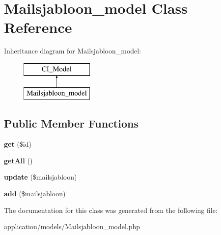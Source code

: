 \hypertarget{class_mailsjabloon__model}{}\section{Mailsjabloon\+\_\+model Class Reference}
\label{class_mailsjabloon__model}
Inheritance diagram for Mailsjabloon\+\_\+model\+:\begin{figure}[H]
\begin{center}
\leavevmode
\includegraphics[height=2.000000cm]{class_mailsjabloon__model}
\end{center}
\end{figure}
\subsection*{Public Member Functions}
\begin{DoxyCompactItemize}
\item 
\mbox{\label{class_mailsjabloon__model_a50e3bfb586b2f42932a6a93f3fbb0828}} 
{\bfseries get} (\$id)
\item 
\mbox{\label{class_mailsjabloon__model_aba0d5b303383fb5b1fabb5fd01cd3800}} 
{\bfseries get\+All} ()
\item 
\mbox{\label{class_mailsjabloon__model_ae7c31bc24182f5bed6dc1bfb9652e9ed}} 
{\bfseries update} (\$mailsjabloon)
\item 
\mbox{\label{class_mailsjabloon__model_a412547fc897d39826ee90937b53995e6}} 
{\bfseries add} (\$mailsjabloon)
\end{DoxyCompactItemize}


The documentation for this class was generated from the following file\+:\begin{DoxyCompactItemize}
\item 
application/models/Mailsjabloon\+\_\+model.\+php\end{DoxyCompactItemize}
